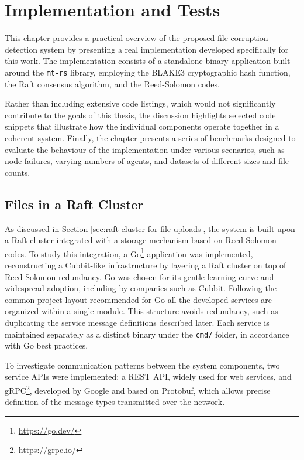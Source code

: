 \chapter{Implementation and Tests}

This chapter provides a practical overview of the proposed file corruption detection system by presenting a real implementation developed specifically for this work. The implementation consists of a standalone binary application built around the \texttt{mt-rs} library, employing the BLAKE3 cryptographic hash function, the Raft consensus algorithm, and the Reed-Solomon codes.

Rather than including extensive code listings, which would not significantly contribute to the goals of this thesis, the discussion highlights selected code snippets that illustrate how the individual components operate together in a coherent system. Finally, the chapter presents a series of benchmarks designed to evaluate the behaviour of the implementation under various scenarios, such as node failures, varying numbers of agents, and datasets of different sizes and file counts.

\section{Files in a Raft Cluster}

As discussed in Section \ref{sec:raft-cluster-for-file-uploads}, the system is built upon a Raft cluster integrated with a storage mechanism based on Reed-Solomon codes. To study this integration, a Go\footnote{\url{https://go.dev/}} application was implemented, reconstructing a Cubbit-like infrastructure by layering a Raft cluster on top of Reed-Solomon redundancy. Go was chosen for its gentle learning curve and widespread adoption, including by companies such as Cubbit. Following the common project layout recommended for Go\cite{go-modules-layout} all the developed services are organized within a single module. This structure avoids redundancy, such as duplicating the service message definitions described later. Each service is maintained separately as a distinct binary under the \texttt{cmd/} folder, in accordance with Go best practices.



To investigate communication patterns between the system components, two service APIs were implemented: a REST API, widely used for web services, and gRPC\footnote{\url{https://grpc.io/}}, developed by Google and based on Protobuf, which allows precise definition of the message types transmitted over the network.

